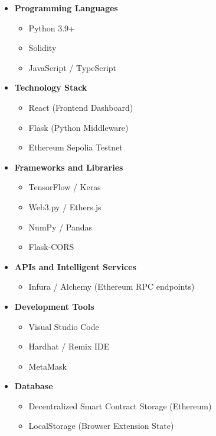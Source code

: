 \begin{itemize}

\item \textbf{Programming Languages}
\begin{itemize}[label=*]
\item Python 3.9+
\item Solidity
\item JavaScript / TypeScript
\end{itemize}

\item \textbf{Technology Stack}
\begin{itemize}[label=*]
\item React (Frontend Dashboard)
\item Flask (Python Middleware)
\item Ethereum Sepolia Testnet
\end{itemize}

\item \textbf{Frameworks and Libraries}
\begin{itemize}[label=*]
\item TensorFlow / Keras
\item Web3.py / Ethers.js
\item NumPy / Pandas
\item Flask-CORS
\end{itemize}

\item \textbf{APIs and Intelligent Services}
\begin{itemize}[label=*]
\item Infura / Alchemy (Ethereum RPC endpoints)
\end{itemize}

\item \textbf{Development Tools}
\begin{itemize}[label=*]
\item Visual Studio Code
\item Hardhat / Remix IDE
\item MetaMask
\end{itemize}

\item \textbf{Database}
\begin{itemize}[label=*]
\item Decentralized Smart Contract Storage (Ethereum)
\item LocalStorage (Browser Extension State)
\end{itemize}

\end{itemize}